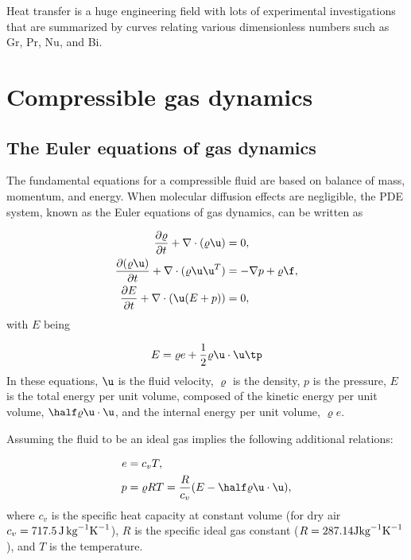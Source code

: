 \documentclass[graybox,envcountchap,sectrefs,final]{svmonodo}
\begin{document}
Heat transfer is a huge engineering
field with lots of experimental investigations
that are summarized by curves relating various dimensionless numbers
such as Gr, Pr, Nu, and Bi.


\section{Compressible gas dynamics}
\label{scale:gasdyn}

\subsection{The Euler equations of gas dynamics}
\label{scale:Euler_eqs}



The fundamental equations for a compressible fluid are based on balance
of mass, momentum, and energy. When molecular diffusion effects are
negligible, the PDE system, known as the Euler
equations of gas dynamics, can be written as

\begin{align}
\frac{\partial\varrho}{\partial t} + \nabla\cdot(\varrho\u) &= 0,
\label{scale:Euler_eqs:mass}\\ 
\frac{\partial(\varrho\u)}{\partial t} + \nabla\cdot(\varrho\u\u^T) &= -\nabla p + \varrho \f,
\label{scale:Euler_eqs:mom}\\ 
\frac{\partial E}{\partial t} + \nabla\cdot(\u(E+p)) &= 0,
\label{scale:Euler_eqs:energy}
\end{align}
with $E$ being

\begin{equation}
E = \varrho e + \frac{1}{2}\varrho\u\cdot\u\tp
\label{scale:Euler_eqs:E}
\end{equation}
In these equations, $\u$ is the fluid velocity, $\varrho$ is the density,
$p$ is the pressure, $E$ is the total energy per unit volume, composed
of the kinetic energy per unit volume, $\half\varrho \u\cdot\u$, and the
internal energy per unit volume, $\varrho e$.

Assuming the fluid to be an ideal gas implies the following additional
relations:

\begin{align}
e &= c_v T,
\label{scale:Euler_eqs:e}\\ 
p &= \varrho RT = \frac{R}{c_v}(E-\half\varrho \u\cdot\u),
\label{scale:Euler_eqs:p}
\end{align}
where $c_v$ is the specific heat capacity at constant volume (for dry air
$c_v = 717.5\, \hbox{J}\,\hbox{kg}^{-1}\hbox{K}^{-1}$),
$R$ is the specific ideal gas constant
($R=287.14 \hbox{J}\hbox{kg}^{-1}\hbox{K}^{-1}$), and $T$ is the temperature.
\end{document}
